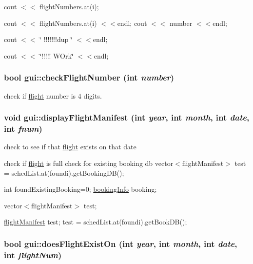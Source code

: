 cout $<$$<$ flightNumbers.at(i);

cout $<$$<$ flightNumbers.at(i) $<$$<$endl; cout $<$$<$ number $<$$<$endl;

cout $<$$<$ \char`\"{} !!!!!!!dup \char`\"{} $<$$<$endl;

cout $<$$<$ \char`\"{}!!!!! WOrk\char`\"{} $<$$<$endl; \hypertarget{classgui_a68a8c8fdbcf6ca93ea3d1233443b185c}{
\subsubsection[{checkFlightNumber}]{\setlength{\rightskip}{0pt plus 5cm}bool gui::checkFlightNumber (int {\em number})}}
\label{classgui_a68a8c8fdbcf6ca93ea3d1233443b185c}


check if \hyperlink{classflight}{flight} number is 4 digits. \hypertarget{classgui_a4f081caa9fddc8d4353c7be8ab753a24}{
\subsubsection[{displayFlightManifest}]{\setlength{\rightskip}{0pt plus 5cm}void gui::displayFlightManifest (int {\em year}, \/  int {\em month}, \/  int {\em date}, \/  int {\em fnum})}}
\label{classgui_a4f081caa9fddc8d4353c7be8ab753a24}


check to see if that \hyperlink{classflight}{flight} exists on that date

check if \hyperlink{classflight}{flight} is full check for existing booking db vector$<$flightManifest$>$ test = schedList.at(foundi).getBookingDB();

int foundExistingBooking=0; \hyperlink{classbooking_info}{bookingInfo} booking;

vector$<$flightManifest$>$ test;

\hyperlink{classflight_manifest}{flightManifest} test; test = schedList.at(foundi).getBookDB(); \hypertarget{classgui_ac5c78b3942440eb0619eeb87d61311d6}{
\subsubsection[{doesFlightExistOn}]{\setlength{\rightskip}{0pt plus 5cm}bool gui::doesFlightExistOn (int {\em year}, \/  int {\em month}, \/  int {\em date}, \/  int {\em flightNum})}}
\label{classgui_ac5c78b3942440eb0619eeb87d61311d6}


